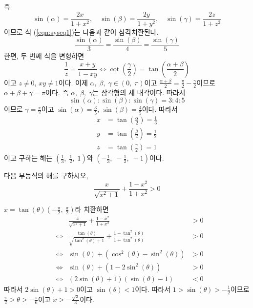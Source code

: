 \documentclass[11pt, a4paper]{book}
\begin{document}
\begin{problem}
{\begin{psolution}
즉
\begin{equation*}
	\sin(\alpha) =\frac{2x}{1+x^{2}}, \quad \sin(\beta) =\frac{2y}{1+y^{2}}, \quad \sin(\gamma) =\frac{2z}{1+z^{2}}
\end{equation*}
이므로 식 (\ref{eqn:syseq1})는 다음과 같이 삼각치환된다.
\begin{equation*}
	\frac{\sin(\alpha)}{3} =\frac{\sin(\beta)}{4} =\frac{\sin(\gamma)}{5}
\end{equation*}
한편, 두 번째 식을 변형하면
\begin{equation*}
	\frac{1}{z} =\frac{x+y}{1-xy} \Leftrightarrow \cot\left(\frac{\gamma}{2}\right) =\tan\left(\frac{\alpha+\beta}{2}\right)
\end{equation*}
이고 $z\neq0$, $xy\neq 1$이다. 이제 $\alpha,\;\beta,\;\gamma \in (0, \;\pi)$이고 $\frac{\alpha+\beta}{2} =\frac{\pi}{2}-\frac{\gamma}{2}$이므로 $\alpha+\beta+\gamma=\pi$이다. 즉 $\alpha,\;\beta,\;\gamma$는 삼각형의 세 내각이다. 따라서
\begin{equation*}
	\sin(\alpha) : \sin(\beta) : \sin(\gamma) = 3 : 4: 5
\end{equation*}
이므로 $\gamma=\frac{\pi}{2}$이고 $\sin(\alpha)=\frac{3}{5}$, $\sin(\beta)=\frac{4}{5}$이다. 따라서
\begin{align*}
	x&=\tan\left(\frac{\alpha}{2}\right) =\frac{1}{3}\\	y&=\tan\left(\frac{\beta}{2}\right)  =\frac{1}{2}\\	z&=\tan\left(\frac{\gamma}{2}\right) = 1
\end{align*}
이고 구하는 해는 $\left(\frac{1}{3}, \; \frac{1}{2}, \; 1\right)$와 $\left(-\frac{1}{3}, \; -\frac{1}{2}, \; -1\right)$이다.
\end{psolution}}
\end{problem}
\vspace{1em}
\begin{example}
	다음 부등식의 해를 구하시오,
	\begin{equation*}
		\frac{x}{\sqrt{x^{2}+1}} + \frac{1-x^{2}}{1+x^{2}} >0
	\end{equation*}
\begin{solution}
		$x=\tan(\theta)\left(-\frac{\pi}{2},\: \frac{\pi}{2}\right)$라 치환하면
\begin{align*}
	  & &	\frac{x}{\sqrt{x^{2}+1}} + \frac{1-x^{2}}{1+x^{2}} &>0\\
		&\Leftrightarrow & \frac{\tan(\theta)}{\sqrt{\tan^{2}(\theta)+1}} + \frac{1-\tan^{2}(\theta)}{1+\tan^{2}(\theta)} &>0\\
		&\Leftrightarrow &\sin(\theta) +\left(\cos^{2}(\theta)-\sin^{2}(\theta)\right) &>0 \\
		&\Leftrightarrow &\sin(\theta) + \left(1-2 \sin^{2}(\theta)\right) &>0 \\
		&\Leftrightarrow & \left(2\sin(\theta)+1\right)\left(\sin(\theta)-1\right) &<0
	\end{align*}
따라서 $2\sin(\theta)+1>0$이고 $\sin(\theta)<1$이다. 따라서 $1>\sin(\theta)>-\frac{1}{2}$이므로 $\frac{\pi}{2}>\theta > -\frac{\pi}{6}$이고 $\boxed{x> -\frac{\sqrt{3}}{3}}$이다.
\end{solution}
\end{example}
\end{document}
